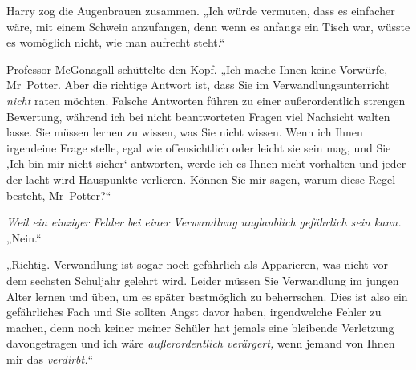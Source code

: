 Harry zog die Augenbrauen zusammen. „Ich würde vermuten, dass es einfacher wäre, mit einem Schwein anzufangen, denn wenn es anfangs ein Tisch war, wüsste es womöglich nicht, wie man aufrecht steht.“ 

Professor McGonagall schüttelte den Kopf. „Ich mache Ihnen keine Vorwürfe, Mr~Potter. Aber die richtige Antwort ist, dass Sie im Verwandlungsunterricht \emph{nicht} raten möchten. Falsche Antworten führen zu einer außerordentlich strengen Bewertung, während ich bei nicht beantworteten Fragen viel Nachsicht walten lasse. Sie müssen lernen zu wissen, was Sie nicht wissen. Wenn ich Ihnen irgendeine Frage stelle, egal wie offensichtlich oder leicht sie sein mag, und Sie ‚Ich bin mir nicht sicher‘ antworten, werde ich es Ihnen nicht vorhalten und jeder der lacht wird Hauspunkte verlieren. Können Sie mir sagen, warum diese Regel besteht, Mr~Potter?“ 

\emph{Weil ein einziger Fehler bei einer Verwandlung unglaublich gefährlich sein kann.} „Nein.“ 

„Richtig. Verwandlung ist sogar noch gefährlich als Apparieren, was nicht vor dem sechsten Schuljahr gelehrt wird. Leider müssen Sie Verwandlung im jungen Alter lernen und üben, um es später bestmöglich zu beherrschen. Dies ist also ein gefährliches Fach und Sie sollten Angst davor haben, irgendwelche Fehler zu machen, denn noch keiner meiner Schüler hat jemals eine bleibende Verletzung davongetragen und ich wäre \emph{außerordentlich verärgert,} wenn jemand von Ihnen mir das \emph{verdirbt.“} 

